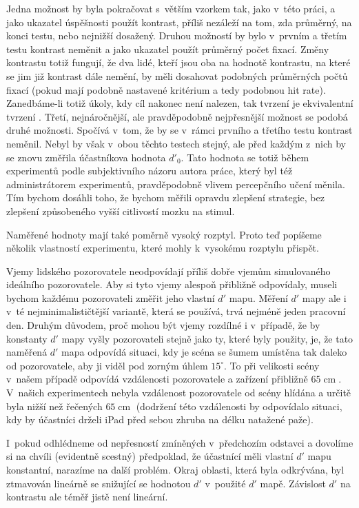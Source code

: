 Jedna možnost by byla pokračovat s~větším vzorkem tak, jako v~této
práci, a jako ukazatel úspěšnosti použít kontrast, příliš nezáleží na tom, zda
průměrný, na konci testu, nebo nejnižší dosažený. Druhou možností by bylo
v~prvním a třetím testu kontrast neměnit a jako ukazatel použít průměrný počet
fixací. Změny kontrastu totiž fungují, že dva lidé, kteří jsou oba
na hodnotě kontrastu, na které se jim již kontrast dále nemění, by měli dosahovat
podobných průměrných počtů fixací (pokud mají podobně nastavené kritérium a
tedy podobnou hit rate). Zanedbáme-li totiž úkoly, kdy cíl nakonec není
nalezen, tak tvrzení  je
ekvivalentní tvrzení . Třetí, nejnáročnější, ale pravděpodobně nejpřesnější možnost se 
podobá druhé možnosti. Spočívá v~tom, že by se v~rámci prvního a třetího
testu kontrast neměnil. Nebyl by však v~obou těchto testech stejný, ale před
každým z~nich by se znovu změřila účastníkova hodnota $d'_0$. Tato hodnota se
totiž během experimentů podle subjektivního názoru autora práce, který byl též
administrátorem experimentů, pravděpodobně vlivem percepčního učení měnila. Tím
bychom dosáhli toho, že bychom měřili opravdu zlepšení strategie, bez zlepšení
způsobeného vyšší citlivostí mozku na stimul.

Naměřené hodnoty mají také poměrně vysoký rozptyl. Proto teď popíšeme několik vlastností
experimentu, které mohly k~vysokému rozptylu přispět.

Vjemy lidského pozorovatele neodpovídají příliš dobře vjemům simulovaného
ideálního pozorovatele. Aby si tyto vjemy alespoň přibližně odpovídaly, museli
bychom každému pozorovateli změřit jeho vlastní $d'$ mapu. Měření $d'$ mapy ale
i  v~té nejminimalističtější variantě, která se používá, trvá nejméně jeden
pracovní den. Druhým důvodem, proč mohou být vjemy rozdílné i v~případě, že by
konstanty $d'$ mapy vyšly pozorovateli stejně jako ty, které byly použity, je, že tato
naměřená $d'$ mapa odpovídá situaci, kdy je scéna se šumem umístěna tak daleko
od pozorovatele, aby ji viděl pod zorným úhlem $15^\circ$. To při velikosti
scény v~našem případě odpovídá vzdálenosti pozorovatele a zařízení přibližně
$65 \operatorname{cm}$. V~našich experimentech nebyla vzdálenost pozorovatele od
scény hlídána a určitě byla nižší než řečených $65 \operatorname{cm}$
(dodržení této vzdálenosti by odpovídalo situaci, kdy by účastníci drželi iPad
před sebou zhruba na délku natažené paže). 

I~pokud odhlédneme od nepřesností zmíněných v~předchozím odstavci a dovolíme
si na chvíli (evidentně scestný) předpoklad, že účastnící měli vlastní $d'$ mapu
konstantní, narazíme na další problém. Okraj oblasti, která byla odkrývána,
byl ztmavován lineárně se snižující se hodnotou $d'$ v~použité $d'$ mapě.
Závislost $d'$ na kontrastu ale téměř jistě
není lineární.

